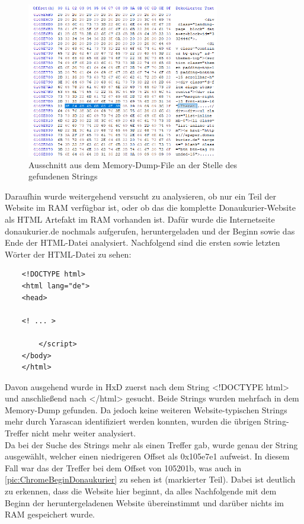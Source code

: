 \begin{figure}[h!]
	\centering
	\includegraphics[width=0.75\textwidth]{bilder/HxDChromeStringThemen.png}
	\caption{Ausschnitt aus dem Memory-Dump-File an der Stelle des gefundenen Strings}
	\label{pic:ChromeStringThemen}
\end{figure} 

Daraufhin wurde weitergehend versucht zu analysieren, ob nur ein Teil der Website im RAM verfügbar ist, oder ob das die komplette Donaukurier-Website als HTML Artefakt im RAM vorhanden ist. Dafür wurde die Internetseite donaukurier.de nochmals aufgerufen, heruntergeladen und der Beginn sowie das Ende der HTML-Datei analysiert. Nachfolgend sind die ersten sowie letzten Wörter der HTML-Datei zu sehen:
\begin{verbatim}
	<!DOCTYPE html>
	<html lang="de">
	<head>
	
	<! ... >
	
	    </script>
	</body>
	</html>
\end{verbatim}

Davon ausgehend wurde in HxD zuerst nach dem String \glqq{}<!DOCTYPE html>\grqq{} und anschließend nach \glqq{}</html>\grqq{} gesucht. Beide Strings wurden mehrfach in dem Memory-Dump gefunden. Da jedoch keine weiteren Website-typischen Strings mehr durch Yarascan identifiziert werden konnten, wurden die übrigen String-Treffer nicht mehr weiter analysiert.\\
Da bei der Suche des Strings mehr als einen Treffer gab, wurde genau der String ausgewählt, welcher einen niedrigeren Offset als 0x105e7e1 aufweist. In diesem Fall war das der Treffer bei dem Offset von 105201b, was auch in \autoref{pic:ChromeBeginDonaukurier} zu sehen ist (markierter Teil). Dabei ist deutlich zu erkennen, dass die Website hier beginnt, da alles Nachfolgende mit dem Beginn der heruntergeladenen Website übereinstimmt und darüber nichts im RAM gespeichert wurde.


